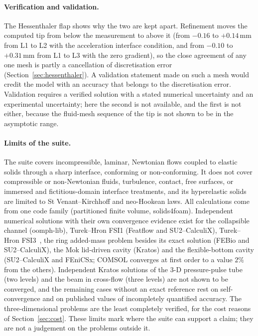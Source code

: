 \paragraph{Verification and validation.}
The Hessenthaler flap shows why the two are kept apart.
Refinement moves the computed tip from below the measurement to above it (from $-0.16$ to $+0.14\,\mathrm{mm}$ from L1 to L2 with the acceleration interface condition, and from $-0.10$ to $+0.31\,\mathrm{mm}$ from L1 to L3 with the zero gradient), so the close agreement of any one mesh is partly a cancellation of discretisation error (Section~\ref{sec:hessenthaler}).
A validation statement made on such a mesh would credit the model with an accuracy that belongs to the discretisation error.
Validation requires a verified solution with a stated numerical uncertainty and an experimental uncertainty; here the second is not available, and the first is not either, because the fluid-mesh sequence of the tip is not shown to be in the asymptotic range.

\paragraph{Limits of the suite.}
The suite covers incompressible, laminar, Newtonian flows coupled to elastic solids through a sharp interface, conforming or non-conforming.
It does not cover compressible or non-Newtonian fluids, turbulence, contact, free surfaces, or immersed and fictitious-domain interface treatments, and its hyperelastic solids are limited to St Venant--Kirchhoff and neo-Hookean laws.
All calculations come from one code family (partitioned finite volume, solids4foam). Independent numerical solutions with their own convergence evidence exist for the collapsible channel (oomph-lib), Turek--Hron FSI1 (Featflow and SU2--CalculiX), Turek--Hron FSI3~\citep{Failer2020}, the ring added-mass problem besides its exact solution (FEBio and SU2--CalculiX), the Mok lid-driven cavity (Kratos) and the flexible-bottom cavity (SU2--CalculiX and FEniCSx; COMSOL converges at first order to a value $2\%$ from the others).
Independent Kratos solutions of the 3-D pressure-pulse tube (two levels) and the beam in cross-flow (three levels) are not shown to be converged, and the remaining cases without an exact reference rest on self-convergence and on published values of incompletely quantified accuracy.
The three-dimensional problems are the least completely verified, for the cost reasons of Section~\ref{sec:cost}.
These limits mark where the suite can support a claim; they are not a judgement on the problems outside it.

